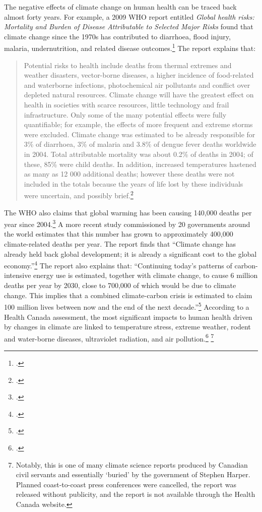 The negative effects of climate change on human health can be traced back almost forty years. 
For example, a 2009 WHO report entitled \emph{Global health risks: Mortality and Burden of Disease Attributable to Selected Major Risks} found that climate change since the 1970s has contributed to diarrhoea, flood injury, malaria, undernutrition, and related disease outcomes.\footcite[][p. 44]{WHOGlobalHealthRisks}
The report explains that:
\begin{quote}
Potential risks to health include deaths from thermal extremes and weather disasters, vector-borne diseases, a higher incidence of food-related and waterborne infections, photochemical air pollutants and conflict over depleted natural resources. Climate change will have the greatest effect on health in societies with scarce resources, little technology and frail infrastructure. Only some of the many potential effects were fully quantifiable; for example, the effects of more frequent and extreme storms were excluded. Climate change was estimated to be already responsible for 3\% of diarrhoea, 3\% of malaria and 3.8\% of dengue fever deaths worldwide in 2004. Total attributable mortality was about 0.2\% of deaths in 2004; of these, 85\% were child deaths. In addition, increased temperatures hastened as many as 12 000 additional deaths; however these deaths were not included in the totals because the years of life lost by these individuals were uncertain, and possibly brief.\footcite[][p. 24]{WHOGlobalHealthRisks}
\end{quote}
The WHO also claims that global warming has been causing 140,000 deaths per year since 2004.\footcite[][]{WHOCCandHealth2012}
A more recent study commissioned by 20 governments around the world estimates that this number has grown to approximately 400,000 climate-related deaths per year.
The report finds that ``Climate change has already held back global development; it is already a significant cost to the global economy.''\footcite[][p. 16]{DARACVM}
The report also explains that: ``Continuing today's patterns of carbon-intensive energy use is estimated, together with climate 
change, to cause 6 million deaths per year by 2030, close to 700,000 of which would be due to climate change. This implies that a combined climate-carbon crisis is estimated to claim 100 million lives between now and the end of the next decade.''\footcite[][p. 17]{DARACVM}
According to a Health Canada assessment, the most significant impacts to human health driven by changes in climate are linked to temperature stress, extreme weather, rodent and water-borne diseases, ultraviolet radiation, and air pollution.\footcite[][]{HHInACC} \footnote{Notably, this is one of many climate science reports produced by Canadian civil servants and essentially `buried' by the government of Stephen Harper. Planned coast-to-coast press conferences were cancelled, the report was released without publicity, and the report is not available through the Health Canada website.}
